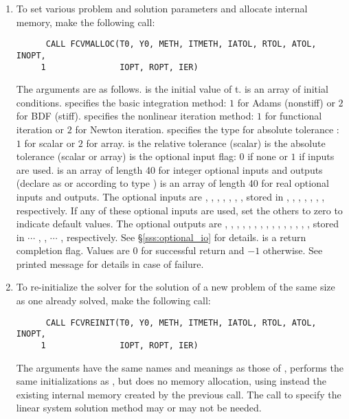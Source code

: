 \begin{enumerate}
\item
  To set various problem and solution parameters and allocate
  internal memory, make the following call:
\begin{verbatim}
      CALL FCVMALLOC(T0, Y0, METH, ITMETH, IATOL, RTOL, ATOL, INOPT,
     1               IOPT, ROPT, IER)
\end{verbatim}
  The arguments are as follows.
   is the initial value of t.
   is an array of initial conditions.
   specifies the  basic integration method: 
       $1$ for Adams (nonstiff) or $2$ for BDF (stiff).
   specifies the nonlinear iteration method: 
       $1$ for functional iteration or $2$ for Newton iteration.
   specifies the type for absolute tolerance :
       $1$ for scalar or $2$ for array.
   is the relative tolerance (scalar)
   is the absolute tolerance (scalar or array)
   is the optional input flag: $0$ if none or $1$ if inputs are used.
   is an array of length 40 for integer optional inputs and outputs
       (declare as  or  according to {\C} type )
   is an array of length 40 for real optional inputs and outputs.
  The optional inputs are , , , , , 
  , , stored in , , , 
  , , , , respectively.  
  If any of these optional inputs are used, set the others to zero to indicate 
  default values. The optional outputs are , , , , 
  , , , , , , , , 
  , , , stored in  $\cdots$ , 
  ,  $\cdots$ , respectively. 
  See \S\ref{sss:optional_io} for details.
   is a return completion flag.  Values are $0$ for successful return and 
      $-1$ otherwise. See printed message for details in case of failure.

\item
  To re-initialize the {\cvode} solver for the solution of a new problem
  of the same size as one already solved, make the following call:
\begin{verbatim}
      CALL FCVREINIT(T0, Y0, METH, ITMETH, IATOL, RTOL, ATOL, INOPT,
     1               IOPT, ROPT, IER)
\end{verbatim}
  The arguments have the same names and meanings as those of ,
   performs the same initializations as
  , but does no memory allocation, using instead the existing
  internal memory created by the previous  call.  The call to
  specify the linear system solution method may or may not be needed.


\end{enumerate}

